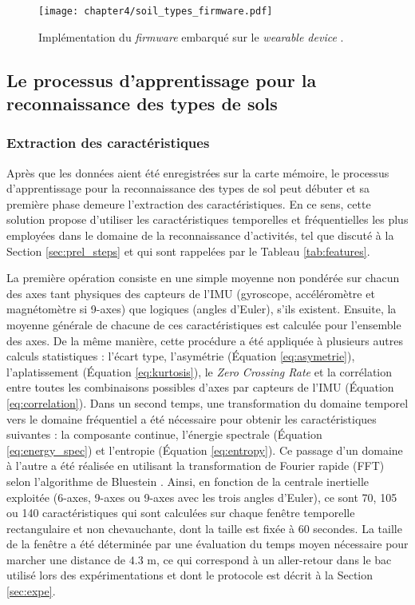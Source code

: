 \begin{figure}[H]
	\centering
	\texttt{[image: chapter4/soil\_types\_firmware.pdf]}
        \caption[Implémentation du \textit{firmware} embarqué sur le \textit{wearable device}.]{Implémentation du \textit{firmware} embarqué sur le \textit{wearable device} \citep{Thullier2017}.}
	\label{fig:soil_types_firmware}
\end{figure}

\subsection{Le processus d'apprentissage pour la reconnaissance des types de sols}
\label{sec:learn}

\subsubsection{Extraction des caractéristiques}

Après que les données aient été enregistrées sur la carte mémoire, le processus d'apprentissage pour la reconnaissance des types de sol peut débuter et sa première phase demeure l'extraction des caractéristiques. En ce sens, cette solution propose d'utiliser les caractéristiques temporelles et fréquentielles les plus employées dans le domaine de la reconnaissance d'activités, tel que discuté à la Section \ref{sec:prel_steps} et qui sont rappelées par le Tableau \ref{tab:features}.

La première opération consiste en une simple moyenne non pondérée sur chacun des axes tant \og{}physiques\fg{} des capteurs de l'\acs{IMU} (gyroscope, accéléromètre et magnétomètre si 9-axes) que \og{}logiques\fg{} (angles d'Euler), s'ils existent. Ensuite, la moyenne générale de chacune de ces caractéristiques est calculée pour l'ensemble des axes. De la même manière, cette procédure a été appliquée à plusieurs autres calculs statistiques : l'écart type, l'asymétrie (Équation \ref{eq:asymetrie}), l'aplatissement (Équation \ref{eq:kurtosis}), le \textit{Zero Crossing Rate} et la corrélation entre toutes les combinaisons possibles d'axes par capteurs de l'\acs{IMU} (Équation \ref{eq:correlation}). Dans un second temps, une transformation du domaine temporel vers le domaine fréquentiel a été nécessaire pour obtenir les caractéristiques suivantes : la composante continue, l'énergie spectrale (Équation \ref{eq:energy_spec}) et l'entropie  (Équation \ref{eq:entropy}). Ce passage d'un domaine à l'autre a été réalisée en utilisant la transformation de Fourier rapide (\acs{FFT}) selon l'algorithme de Bluestein \citep{Bluestein1970}. Ainsi, en fonction de la centrale inertielle exploitée (6-axes, 9-axes ou 9-axes avec les trois angles d'Euler), ce sont 70, 105 ou 140 caractéristiques qui sont calculées sur chaque fenêtre temporelle rectangulaire et non chevauchante, dont la taille est fixée à 60 secondes. La taille de la fenêtre a été déterminée par une évaluation du temps moyen nécessaire pour marcher une distance de $4.3$ m, ce qui correspond à un aller-retour dans le bac utilisé lors des expérimentations et dont le protocole est décrit à la Section \ref{sec:expe}.

